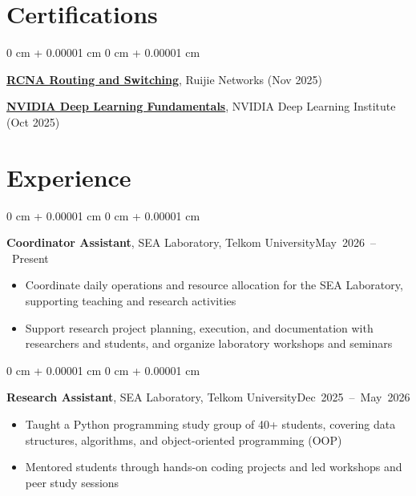 \documentclass[10pt, a4paper]{article}
\newenvironment{highlights}{
    \begin{itemize}[
        topsep=0.10 cm,
        parsep=0.10 cm,
        partopsep=0pt,
        itemsep=0pt,
        leftmargin=0 cm + 10pt
    ]
}{
    \end{itemize}
} %
\newenvironment{onecolentry}{
    \begin{adjustwidth}{
        0 cm + 0.00001 cm
    }{
        0 cm + 0.00001 cm
    }
}{
    \end{adjustwidth}
} %
\newcommand{\entryheading}[2]{#1\hspace{0pt plus 1filll}\mbox{#2}\par}
\begin{document}
    \section{Certifications}

        \begin{onecolentry}
            \entryheading{\textbf{\href{https://www.linkedin.com/in/reynadiap/overlay/1762782549588/single-media-viewer/?type=DOCUMENT&profileId=ACoAAC2cqroBm5AmDvlUW2ik_oNCe9Mrxq0tcBQ}{RCNA Routing and Switching}}, Ruijie Networks (Nov 2025)}{}

            \entryheading{\textbf{\href{https://learn.nvidia.com/certificates?id=1obDtIR5SJWcCdQ3BAuFSg}{NVIDIA Deep Learning Fundamentals}}, NVIDIA Deep Learning Institute (Oct 2025)}{}
        \end{onecolentry}

    \section{Experience}

        \begin{onecolentry}
            \entryheading{\textbf{Coordinator Assistant}, SEA Laboratory, Telkom University}{May 2026 – Present}
            \begin{highlights}
                \item Coordinate daily operations and resource allocation for the SEA Laboratory, supporting teaching and research activities
                \item Support research project planning, execution, and documentation with researchers and students, and organize laboratory workshops and seminars
            \end{highlights}
        \end{onecolentry}

        \vspace{0.2 cm}

        \begin{onecolentry}
            \entryheading{\textbf{Research Assistant}, SEA Laboratory, Telkom University}{Dec 2025 – May 2026}
            \begin{highlights}
                \item Taught a Python programming study group of 40+ students, covering data structures, algorithms, and object-oriented programming (OOP)
                \item Mentored students through hands-on coding projects and led workshops and peer study sessions
            \end{highlights}
        \end{onecolentry}
\end{document}
